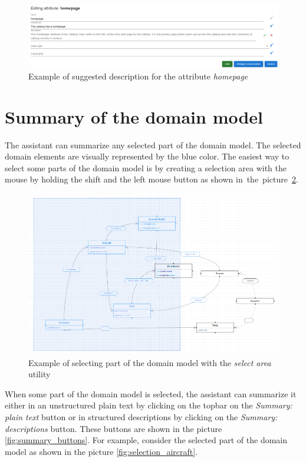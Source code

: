\begin{figure}[!h]
    \includegraphics[scale=0.31]{../docs/images/frontend/suggested-single-field.png}
    \caption{\centering Example of suggested description for the attribute \textit{homepage}}
    \label{fig:suggested_single_field}
\end{figure}


\section{Summary of the domain model}

The assistant can summarize any selected part of the domain model. The selected domain elements are visually represented by the blue color. The easiest way to select some parts of the domain model is by creating a selection area with the mouse by holding the shift and the left mouse button as shown in~the~picture~\ref{fig:selection}.

\begin{figure}[!h]
    \includegraphics[scale=0.33]{../docs/images/frontend/selection.png}
    \caption{\centering Example of selecting part of the domain model with the \textit{select area} utility}
    \label{fig:selection}
\end{figure}

When some part of the domain model is selected, the assistant can summarize it either in an unstructured plain text by clicking on the topbar on the \textit{Summary: plain text} button or in structured descriptions by clicking on the \textit{Summary: descriptions} button. These buttons are shown in the picture \ref{fig:summary_buttons}. For example, consider the selected part of the domain model as shown in the picture \ref{fig:selection_aircraft}.

